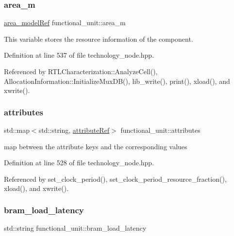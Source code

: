 \subsubsection{\texorpdfstring{area\+\_\+m}{area\_m}}
{\footnotesize\ttfamily \hyperlink{area__model_8hpp_aec11e4e9b1b3afd49a437cb37df0abfb}{area\+\_\+model\+Ref} functional\+\_\+unit\+::area\+\_\+m}



This variable stores the resource information of the component. 



Definition at line 537 of file technology\+\_\+node.\+hpp.



Referenced by R\+T\+L\+Characterization\+::\+Analyze\+Cell(), Allocation\+Information\+::\+Initialize\+Mux\+D\+B(), lib\+\_\+write(), print(), xload(), and xwrite().

\mbox{\label{structfunctional__unit_aadd67b69373fed207c5c01ebaf984eea}} 
\subsubsection{\texorpdfstring{attributes}{attributes}}
{\footnotesize\ttfamily std\+::map$<$std\+::string, \hyperlink{library__manager_8hpp_a46399d2eacc03fb10f84fb33987ab8e3}{attribute\+Ref}$>$ functional\+\_\+unit\+::attributes}



map between the attribute keys and the corresponding values 



Definition at line 528 of file technology\+\_\+node.\+hpp.



Referenced by set\+\_\+clock\+\_\+period(), set\+\_\+clock\+\_\+period\+\_\+resource\+\_\+fraction(), xload(), and xwrite().

\mbox{\label{structfunctional__unit_abcbfc67a4c3dfa44a24c2b6dbe783e39}} 
\subsubsection{\texorpdfstring{bram\+\_\+load\+\_\+latency}{bram\_load\_latency}}
{\footnotesize\ttfamily std\+::string functional\+\_\+unit\+::bram\+\_\+load\+\_\+latency}



